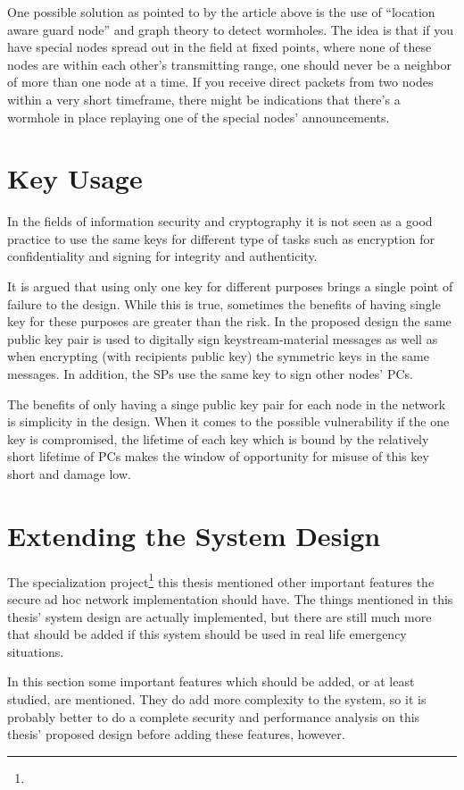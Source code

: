 One possible solution as pointed to by the article above is the use of
``location aware guard node'' and graph theory \cite{poovendran2007graph}
\cite{lazos2005preventing} to detect wormholes. The idea is that if you have
special nodes spread out in the field at fixed points, where none of these nodes
are within each other's transmitting range, one should never be a neighbor of
more than one node at a time. If you receive direct packets from two nodes
within a very short timeframe, there might be indications that there's a
wormhole in place replaying one of the special nodes' announcements.

\section{Key Usage}
In the fields of information security and cryptography it is not seen as a good
practice to use the same keys for different type of tasks such as encryption 
for confidentiality and signing for integrity and authenticity.

It is argued that using only one key for different purposes brings a single
point of failure to the design. While this is true, sometimes the benefits of
having single key for these purposes are greater than the risk. In the proposed
design the same public key pair is used to digitally sign keystream-material
messages as well as when encrypting (with recipients public key) the symmetric
keys in the same messages. In addition, the \acp{SP} use the same key to sign
other nodes' \acp{PC}.

The benefits of only having a singe public key pair for each node in the network
is simplicity in the design. When it comes to the possible vulnerability if the
one key is compromised, the lifetime of each key which is bound by the
relatively short lifetime of \acp{PC} makes the window of opportunity for misuse
of this key short and damage low.

\section{Extending the System Design}
The specialization project\footnote{} this thesis mentioned other important
features the secure ad hoc network implementation should have. The things
mentioned in this thesis' system design are actually implemented, but there are
still much more that should be added if this system should be used in real life
emergency situations.

In this section some important features which should be added, or at least
studied, are mentioned. They do add more complexity to the system, so it is
probably better to do a complete security and performance analysis on this
thesis' proposed design before adding these features, however.

